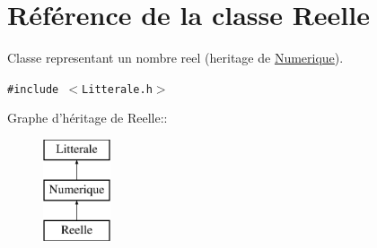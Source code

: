 \hypertarget{class_reelle}{
\section{Référence de la classe Reelle}
\label{class_reelle}
}
Classe representant un nombre reel (heritage de \hyperlink{class_numerique}{Numerique}).  


{\tt \#include $<$Litterale.h$>$}

Graphe d'héritage de Reelle::\begin{figure}[H]
\begin{center}
\leavevmode
\includegraphics[height=3cm]{class_reelle}
\end{center}
\end{figure}
